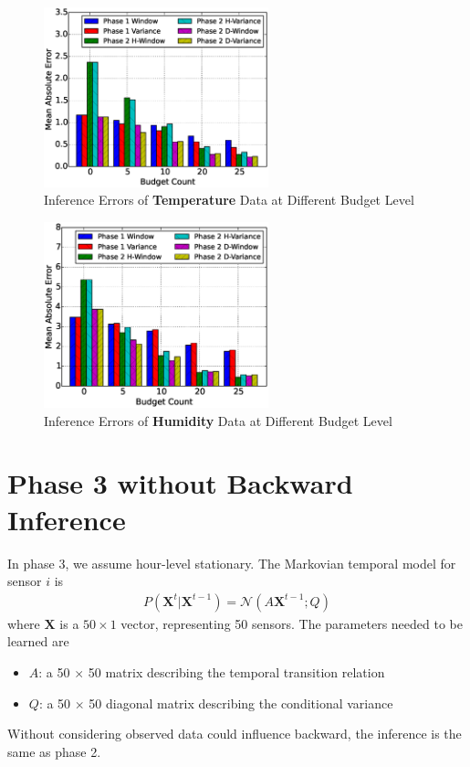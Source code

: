 \documentclass[12pt]{article}  %
\theoremstyle{definition}
\theoremstyle{remark}
\begin{document}
\begin{figure}[h]
\centering
        \includegraphics[width=0.58\textwidth]{../phase2/temperature_err}
        \caption{Inference Errors of \textbf{Temperature} Data at Different Budget Level}
\label{fig:phase1:temperature}
\end{figure}

\begin{figure}[h]
\centering
        \includegraphics[width=0.58\textwidth]{../phase2/humidity_err}
        \caption{Inference Errors of \textbf{Humidity} Data at Different Budget Level}
\label{fig:phase1:humidity}
\end{figure}


\section{Phase 3 without Backward Inference}
In phase 3, we assume hour-level stationary.
The Markovian temporal model for sensor $i$ is
\begin{align}
        P(\mathbf{X}^t | \mathbf{X}^{t-1}) = \mathcal{N}(\mathit{A} \mathbf{X}^{t-1}; Q)
\end{align}
where $\mathbf{X}$ is a $50 \times 1$ vector, representing 50 sensors.
The parameters needed to be learned are
\begin{itemize}
\item $\mathit{A}$: a 50 $\times$ 50 matrix describing the temporal transition relation
\item $\mathit{Q}$: a 50 $\times$ 50 diagonal matrix describing the conditional variance
\end{itemize}
Without considering observed data could influence backward,
the inference is the same as phase 2.
\end{document}
